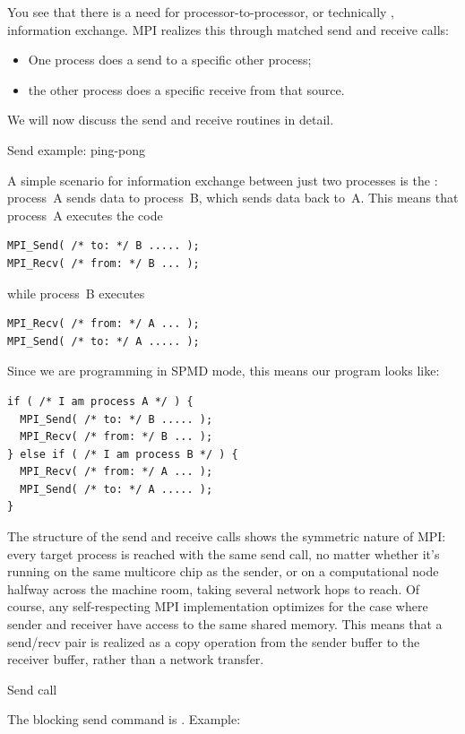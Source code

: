 You see that there is a need for processor-to-processor, or
technically , information exchange.
MPI realizes this through matched send and receive calls:
\begin{itemize}
\item One process does a send to a specific other process;
\item the other process does a specific receive from that source.
\end{itemize}

We will now discuss the send and receive routines in detail.

 {Send example: ping-pong}
\label{sec:mpi-send-recv}

A simple scenario for information exchange between just two processes
is the : process~A sends data to process~B, which
sends data back to~A. This means that process~A executes the code
\begin{lstlisting}
MPI_Send( /* to: */ B ..... );
MPI_Recv( /* from: */ B ... );
\end{lstlisting}
while process~B executes
\begin{lstlisting}
MPI_Recv( /* from: */ A ... );
MPI_Send( /* to: */ A ..... );
\end{lstlisting}
Since we are programming in SPMD mode, this means our program looks like:
\begin{lstlisting}
if ( /* I am process A */ ) {
  MPI_Send( /* to: */ B ..... );
  MPI_Recv( /* from: */ B ... );
} else if ( /* I am process B */ ) {
  MPI_Recv( /* from: */ A ... );
  MPI_Send( /* to: */ A ..... );
}
\end{lstlisting}

\begin{remark}
  The structure of the send and receive calls shows the symmetric nature of MPI: every
  target process is reached with the same send call, no matter whether it's
  running on the same multicore chip as the sender, or on a
  computational node halfway across the machine room, taking
  several network hops to reach. Of course, any
  self-respecting MPI implementation optimizes for the case where sender
  and receiver have access to the same shared memory.
  This means that a send/recv pair is realized as
  a copy operation from the sender buffer to the
  receiver buffer, rather than a network transfer.
\end{remark}

 {Send call}

The blocking send command is
%
.
%
Example:

